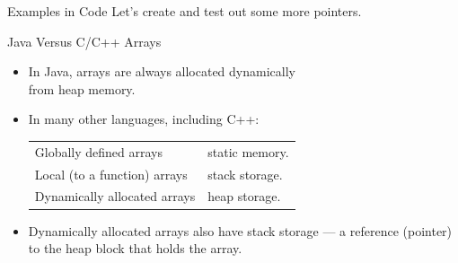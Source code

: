 \documentclass[14pt,aspectratio=1610]{beamer}
\begin{document}
\begin{frame}{Examples in Code}
\centering\Large
Let's create and test out some more pointers.
\end{frame}

\begin{frame}{Java Versus C/C++ Arrays}

\begin{itemize}[<+->]
\item
  In Java, arrays are always allocated dynamically \\from heap memory.
\item
  In many other languages, including C++:\\
  \begin{tabular}{l @{ -- } l}
    Globally defined arrays & static memory.\\
    Local (to a function) arrays & stack storage.\\
    Dynamically allocated arrays & heap storage.\\
  \end{tabular}
\item
  Dynamically allocated arrays also have stack storage --- a
  reference (pointer) to the heap block that holds the array.
\end{itemize}
\end{frame}
\end{document}
